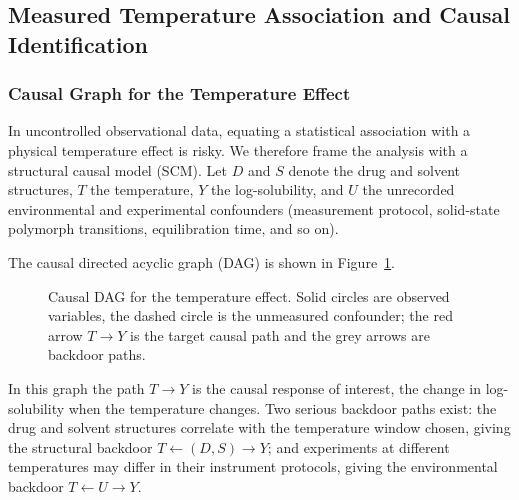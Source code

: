 \subsection{Measured Temperature Association and Causal Identification}\label{sec:temperature-association}

\subsubsection{Causal Graph for the Temperature Effect}

In uncontrolled observational data, equating a statistical association with a physical temperature effect is risky. We therefore frame the analysis with a structural causal model (SCM)\cite{pearl2009}. Let $D$ and $S$ denote the drug and solvent structures, $T$ the temperature, $Y$ the log-solubility, and $U$ the unrecorded environmental and experimental confounders (measurement protocol, solid-state polymorph transitions, equilibration time, and so on).

The causal directed acyclic graph (DAG) is shown in Figure~\ref{fig:causal-dag}.
\begin{figure}[htbp]
\centering
{}
\caption{Causal DAG for the temperature effect. Solid circles are observed variables, the dashed circle is the unmeasured confounder; the red arrow $T \to Y$ is the target causal path and the grey arrows are backdoor paths.}
\label{fig:causal-dag}
\end{figure}
In this graph the path $T \to Y$ is the causal response of interest, the change in log-solubility when the temperature changes. Two serious backdoor paths exist: the drug and solvent structures correlate with the temperature window chosen, giving the structural backdoor $T \leftarrow (D, S) \to Y$; and experiments at different temperatures may differ in their instrument protocols, giving the environmental backdoor $T \leftarrow U \to Y$.

